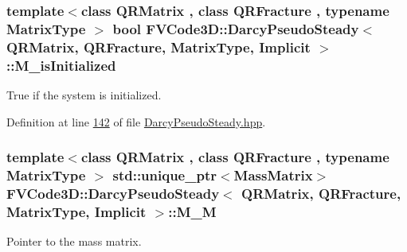 \subsubsection[{\texorpdfstring{M\+\_\+is\+Initialized}{M_isInitialized}}]{\setlength{\rightskip}{0pt plus 5cm}template$<$class Q\+R\+Matrix , class Q\+R\+Fracture , typename Matrix\+Type $>$ bool {\bf F\+V\+Code3\+D\+::\+Darcy\+Pseudo\+Steady}$<$ Q\+R\+Matrix, Q\+R\+Fracture, Matrix\+Type, {\bf Implicit} $>$\+::M\+\_\+is\+Initialized\hspace{0.3cm}{\ttfamily [protected]}}\hypertarget{classFVCode3D_1_1DarcyPseudoSteady_3_01QRMatrix_00_01QRFracture_00_01MatrixType_00_01Implicit_01_4_a298983a6d466bf5906abf47e4199cb79}{}\label{classFVCode3D_1_1DarcyPseudoSteady_3_01QRMatrix_00_01QRFracture_00_01MatrixType_00_01Implicit_01_4_a298983a6d466bf5906abf47e4199cb79}


True if the system is initialized. 



Definition at line \hyperlink{DarcyPseudoSteady_8hpp_source_l00142}{142} of file \hyperlink{DarcyPseudoSteady_8hpp_source}{Darcy\+Pseudo\+Steady.\+hpp}.

\subsubsection[{\texorpdfstring{M\+\_\+M}{M_M}}]{\setlength{\rightskip}{0pt plus 5cm}template$<$class Q\+R\+Matrix , class Q\+R\+Fracture , typename Matrix\+Type $>$ std\+::unique\+\_\+ptr$<${\bf Mass\+Matrix}$>$ {\bf F\+V\+Code3\+D\+::\+Darcy\+Pseudo\+Steady}$<$ Q\+R\+Matrix, Q\+R\+Fracture, Matrix\+Type, {\bf Implicit} $>$\+::M\+\_\+M\hspace{0.3cm}{\ttfamily [protected]}}\hypertarget{classFVCode3D_1_1DarcyPseudoSteady_3_01QRMatrix_00_01QRFracture_00_01MatrixType_00_01Implicit_01_4_a7105356f402824767287690e83c0977d}{}\label{classFVCode3D_1_1DarcyPseudoSteady_3_01QRMatrix_00_01QRFracture_00_01MatrixType_00_01Implicit_01_4_a7105356f402824767287690e83c0977d}


Pointer to the mass matrix. 



